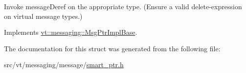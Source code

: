 Invoke message\+Deref on the appropriate type. (Ensure a valid delete-\/expression on virtual message types.) 

Implements \hyperlink{structvt_1_1messaging_1_1_msg_ptr_impl_base_a1fcd13da7faa98a9d4681e572d4b494b}{vt\+::messaging\+::\+Msg\+Ptr\+Impl\+Base}.



The documentation for this struct was generated from the following file\+:\begin{DoxyCompactItemize}
\item 
src/vt/messaging/message/\hyperlink{smart__ptr_8h}{smart\+\_\+ptr.\+h}\end{DoxyCompactItemize}
